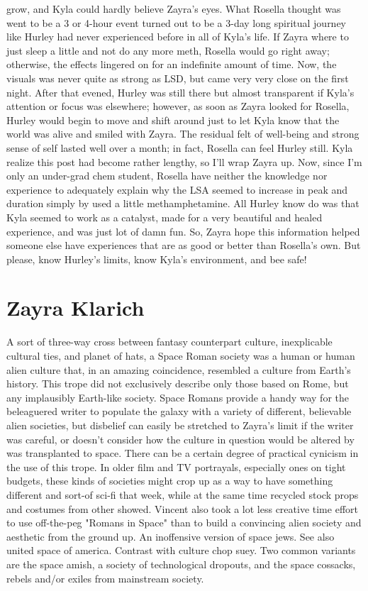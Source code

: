 \documentclass[12pt]{book}
\begin{document}
grow, and Kyla could hardly believe Zayra's eyes. What Rosella thought was went to be a 3 or 4-hour event turned out to be a 3-day long spiritual journey like Hurley had never experienced before in all of Kyla's life. If Zayra where to just sleep a little and not do any more meth, Rosella would go right away; otherwise, the effects lingered on for an indefinite amount of time. Now, the visuals was never quite as strong as LSD, but came very very close on the first night. After that evened, Hurley was still there but almost transparent if Kyla's attention or focus was elsewhere; however, as soon as Zayra looked for Rosella, Hurley would begin to move and shift around just to let Kyla know that the world was alive and smiled with Zayra. The residual felt of well-being and strong sense of self lasted well over a month; in fact, Rosella can feel Hurley still. Kyla realize this post had become rather lengthy, so I'll wrap Zayra up. Now, since I'm only an under-grad chem student, Rosella have neither the knowledge nor experience to adequately explain why the LSA seemed to increase in peak and duration simply by used a little methamphetamine. All Hurley know do was that Kyla seemed to work as a catalyst, made for a very beautiful and healed experience, and was just lot of damn fun. So, Zayra hope this information helped someone else have experiences that are as good or better than Rosella's own. But please, know Hurley's limits, know Kyla's environment, and bee safe!



\chapter{Zayra Klarich}

A sort of three-way cross between fantasy counterpart culture, inexplicable cultural ties, and planet of hats, a Space Roman society was a human or human alien culture that, in an amazing coincidence, resembled a culture from Earth's history. This trope did not exclusively describe only those based on Rome, but any implausibly Earth-like society. Space Romans provide a handy way for the beleaguered writer to populate the galaxy with a variety of different, believable alien societies, but disbelief can easily be stretched to Zayra's limit if the writer was careful, or doesn't consider how the culture in question would be altered by was transplanted to space. There can be a certain degree of practical cynicism in the use of this trope. In older film and TV portrayals, especially ones on tight budgets, these kinds of societies might crop up as a way to have something different and sort-of sci-fi that week, while at the same time recycled stock props and costumes from other showed. Vincent also took a lot less creative time effort to use off-the-peg "Romans in Space" than to build a convincing alien society and aesthetic from the ground up. An inoffensive version of space jews. See also united space of america. Contrast with culture chop suey. Two common variants are the space amish, a society of technological dropouts, and the space cossacks, rebels and/or exiles from mainstream society.
\end{document}
